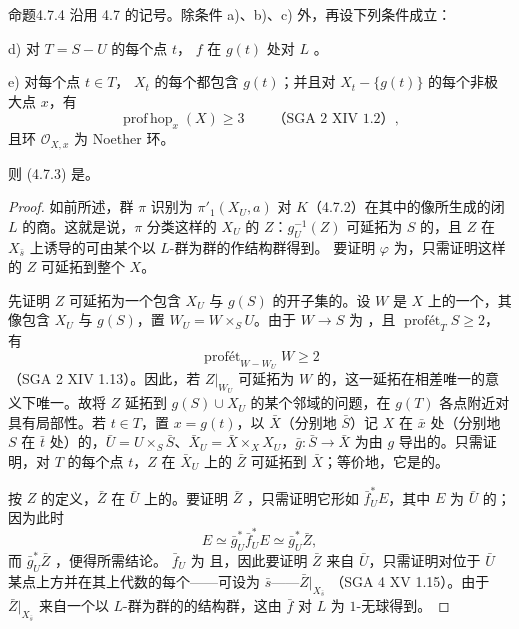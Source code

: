 \begin{SGAresult}{命题}{4.7.4}
沿用 4.7 的记号。除条件 a)、b)、c) 外，再设下列条件成立：

d) 对 $T=S-U$ 的每个点 $t$， $f$ 在 $g(t)$ 处对 $L$ 。

e) 对每个点 $t\in T$， $X_t$ 的每个都包含 $g(t)$；并且对 $X_t-\{g(t)\}$ 的每个非极大点 $x$，有
\[\operatorname{prof\,hop}_x(X)\geq3\qquad\text{（SGA 2 XIV 1.2）},\]
且环 $\mathcal O_{X,x}$ 为 Noether 环。

则 (4.7.3) 是。
\end{SGAresult}
\begin{proof}
如前所述，群 $\pi$ 识别为 $\pi'_1(X_U,a)$ 对 $K$（4.7.2）在其中的像所生成的闭 $L$ 的商。这就是说，$\pi$ 分类这样的 $X_U$ 的 $Z$：$g_U^{-1}(Z)$ 可延拓为 $S$ 的，且 $Z$ 在 $X_{\bar s}$ 上诱导的可由某个以 $L$-群为群的作结构群得到。
要证明 $\varphi$ 为，只需证明这样的 $Z$ 可延拓到整个 $X$。

先证明 $Z$ 可延拓为一个包含 $X_U$ 与 $g(S)$ 的开子集的。设 $W$ 是 $X$ 上的一个，其像包含 $X_U$ 与 $g(S)$，置 $W_U=W\times_S U$。由于 $W\to S$ 为 ，且 $\operatorname{prof\text{ét}}_T S\geq2$，有
\[\operatorname{prof\text{ét}}_{W-W_U}W\geq2\]
（SGA 2 XIV 1.13）。因此，若 $Z|_{W_U}$ 可延拓为 $W$ 的，这一延拓在相差唯一的意义下唯一。故将 $Z$ 延拓到 $g(S)\cup X_U$ 的某个邻域的问题，在 $g(T)$ 各点附近对具有局部性。若 $t\in T$，置 $x=g(t)$，以 $\bar X$（分别地 $\bar S$）记 $X$ 在 $\bar x$ 处（分别地 $S$ 在 $\bar t$ 处）的，$\bar U=U\times_S\bar S$、$\bar X_U=\bar X\times_X X_U$，$\bar g:\bar S\to\bar X$ 为由 $g$ 导出的。只需证明，对 $T$ 的每个点 $t$，$Z$ 在 $\bar X_U$ 上的 $\bar Z$ 可延拓到 $\bar X$；等价地，它是的。

按 $Z$ 的定义，$\bar Z$ 在 $\bar U$ 上的。要证明 $\bar Z$ ，只需证明它形如 $\bar f_U^*E$，其中 $E$ 为 $\bar U$ 的；因为此时
\[E\simeq\bar g_U^*\bar f_U^*E\simeq\bar g_U^*\bar Z,\]
而 $\bar g_U^*\bar Z$ ，便得所需结论。 $\bar f_U$ 为 且，因此要证明 $\bar Z$ 来自 $\bar U$，只需证明对位于 $\bar U$ 某点上方并在其上代数的每个——可设为 $\bar s$——$\bar Z|_{X_{\bar s}}$ （SGA 4 XV 1.15）。由于 $\bar Z|_{X_{\bar s}}$ 来自一个以 $L$-群为群的的结构群，这由 $\bar f$ 对 $L$ 为 $1$-无球得到。


\end{proof}
